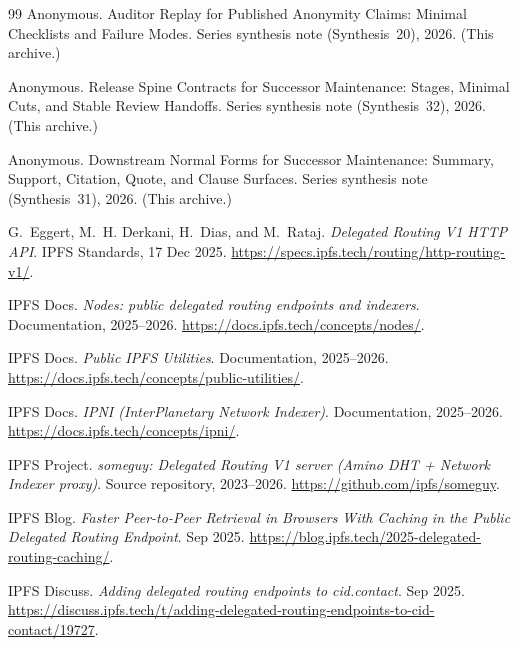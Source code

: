 \documentclass[11pt]{article}
\begin{document}
\begin{thebibliography}{99}
Anonymous.
\newblock Auditor Replay for Published Anonymity Claims: Minimal Checklists and Failure Modes.
\newblock Series synthesis note (Synthesis~20), 2026. (This archive.)

Anonymous.
\newblock Release Spine Contracts for Successor Maintenance: Stages, Minimal Cuts, and Stable Review Handoffs.
\newblock Series synthesis note (Synthesis~32), 2026. (This archive.)

Anonymous.
\newblock Downstream Normal Forms for Successor Maintenance: Summary, Support, Citation, Quote, and Clause Surfaces.
\newblock Series synthesis note (Synthesis~31), 2026. (This archive.)

G.~Eggert, M.~H. Derkani, H.~Dias, and M.~Rataj.
\newblock \emph{Delegated Routing V1 HTTP API}.
\newblock IPFS Standards, 17 Dec 2025.
\newblock \url{https://specs.ipfs.tech/routing/http-routing-v1/}.

IPFS Docs.
\newblock \emph{Nodes: public delegated routing endpoints and indexers}.
\newblock Documentation, 2025--2026.
\newblock \url{https://docs.ipfs.tech/concepts/nodes/}.

IPFS Docs.
\newblock \emph{Public IPFS Utilities}.
\newblock Documentation, 2025--2026.
\newblock \url{https://docs.ipfs.tech/concepts/public-utilities/}.

IPFS Docs.
\newblock \emph{IPNI (InterPlanetary Network Indexer)}.
\newblock Documentation, 2025--2026.
\newblock \url{https://docs.ipfs.tech/concepts/ipni/}.

IPFS Project.
\newblock \emph{someguy: Delegated Routing V1 server (Amino DHT + Network Indexer proxy)}.
\newblock Source repository, 2023--2026.
\newblock \url{https://github.com/ipfs/someguy}.

IPFS Blog.
\newblock \emph{Faster Peer-to-Peer Retrieval in Browsers With Caching in the Public Delegated Routing Endpoint}.
 Sep 2025.
\newblock \url{https://blog.ipfs.tech/2025-delegated-routing-caching/}.

IPFS Discuss.
\newblock \emph{Adding delegated routing endpoints to cid.contact}.
 Sep 2025.
\newblock \url{https://discuss.ipfs.tech/t/adding-delegated-routing-endpoints-to-cid-contact/19727}.



\end{thebibliography}
\end{document}
